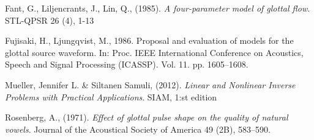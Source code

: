 \documentclass[12pt,a4]{article}
\begin{document}
\newpage
\begin{thebibliography}{9}

    Fant, G., Liljencrants, J., Lin, Q., (1985).
    \emph{A four-parameter model of glottal flow}.
    STL-QPSR 26 (4), 1-13
    
    Fujisaki, H., Ljungqvist, M., 1986.
    Proposal and evaluation of models for the glottal source waveform.
    In: Proc. IEEE International Conference on Acoustics, Speech and Signal Processing (ICASSP). Vol. 11. pp. 1605–1608.
    
	Mueller, Jennifer L. \& Siltanen Samuli, (2012).
	\emph{Linear and Nonlinear Inverse Problems with Practical Applications}.
	SIAM, 1:st edition

    Rosenberg, A., (1971).
    \emph{Effect of glottal pulse shape on the quality of natural vowels}.
    Journal of the Acoustical Society of America 49 (2B), 583–590.

\end{thebibliography}
\end{document}
